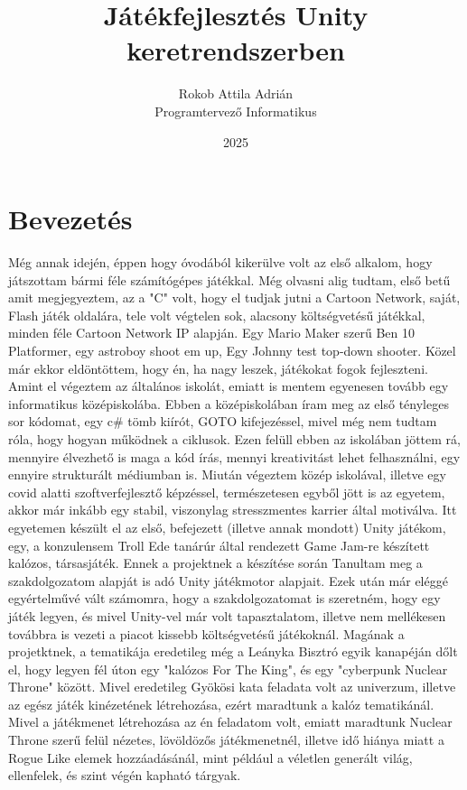 \documentclass[
]{thesis-ekf}
\theoremstyle{definition}
\theoremstyle{remark}
\begin{document}
\title{Játékfejlesztés Unity keretrendszerben}
\author{Rokob Attila Adrián\\Programtervező Informatikus}
\date{2025}
\maketitle

\tableofcontents

\chapter*{Bevezetés}


Még annak idején, éppen hogy óvodából kikerülve volt az első alkalom, hogy játszottam bármi féle számítógépes játékkal. Még olvasni alig tudtam, első betű amit megjegyeztem, az a "C" volt, hogy el tudjak jutni a Cartoon Network, saját, Flash játék oldalára, tele volt végtelen sok, alacsony költségvetésű játékkal, minden féle Cartoon Network IP alapján. Egy Mario Maker szerű Ben 10 Platformer, egy astroboy shoot em up, Egy Johnny test top-down shooter. 
Közel már ekkor eldöntöttem, hogy én, ha nagy leszek, játékokat fogok fejleszteni. Amint el végeztem az általános iskolát, emiatt is mentem egyenesen tovább egy informatikus középiskolába. Ebben a középiskolában íram meg az első tényleges sor kódomat, egy c\# tömb kiírót, GOTO kifejezéssel, mivel még nem tudtam róla, hogy hogyan működnek a ciklusok. Ezen felüll ebben az iskolában jöttem rá, mennyire élvezhető is maga a kód írás, mennyi kreativitást lehet felhasználni, egy ennyire strukturált médiumban is. 
Miután végeztem közép iskolával, illetve egy covid alatti szoftverfejlesztő képzéssel, természetesen egyből jött is az egyetem, akkor már inkább egy stabil, viszonylag stresszmentes karrier által motiválva.
Itt egyetemen készült el az első, befejezett (illetve annak mondott) Unity játékom, egy, a konzulensem Troll Ede tanárúr által rendezett Game Jam-re készített kalózos, társasjáték.
Ennek a projektnek a készítése során Tanultam meg a szakdolgozatom alapját is adó Unity játékmotor alapjait. Ezek után már eléggé egyértelművé vált számomra, hogy a szakdolgozatomat is szeretném, hogy egy játék legyen, és mivel Unity-vel már volt tapasztalatom, illetve nem mellékesen továbbra is vezeti a piacot kissebb költségvetésű játékoknál.
Magának a projetktnek, a tematikája eredetileg még a Leányka Bisztró egyik kanapéján dőlt el, hogy legyen fél úton egy "kalózos For The King", és egy "cyberpunk Nuclear Throne" között. Mivel eredetileg Gyökösi kata feladata volt az univerzum, illetve az egész játék kinézetének létrehozása, ezért maradtunk a kalóz tematikánál. Mivel a játékmenet létrehozása az én feladatom volt, emiatt maradtunk Nuclear Throne szerű felül nézetes, lövöldözős játékmenetnél, illetve idő hiánya miatt a Rogue Like elemek hozzáadásánál, mint például a véletlen generált világ, ellenfelek, és szint végén kapható tárgyak.
\end{document}
